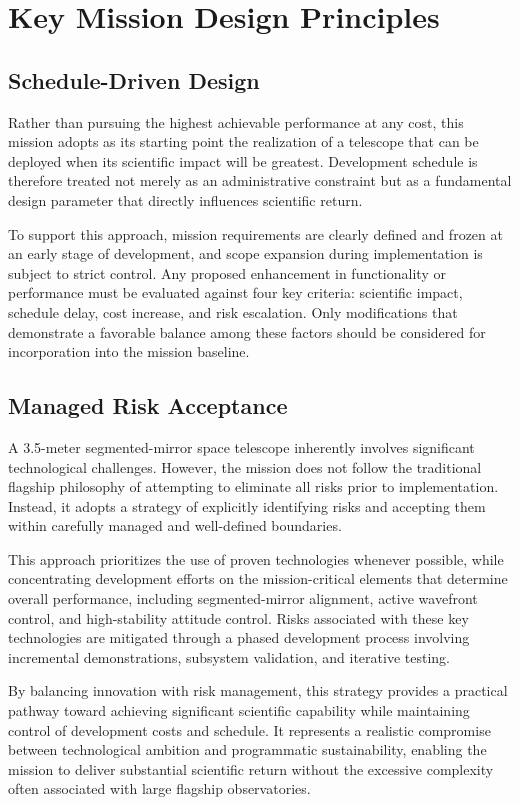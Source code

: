 \section{Key Mission Design Principles}

\subsection{Schedule-Driven Design}

Rather than pursuing the highest achievable performance at any cost, this mission adopts as its starting point the realization of a telescope that can be deployed when its scientific impact will be greatest. Development schedule is therefore treated not merely as an administrative constraint but as a fundamental design parameter that directly influences scientific return.

To support this approach, mission requirements are clearly defined and frozen at an early stage of development, and scope expansion during implementation is subject to strict control. Any proposed enhancement in functionality or performance must be evaluated against four key criteria: scientific impact, schedule delay, cost increase, and risk escalation. Only modifications that demonstrate a favorable balance among these factors should be considered for incorporation into the mission baseline.

\subsection{Managed Risk Acceptance}

A 3.5-meter segmented-mirror space telescope inherently involves significant technological challenges. However, the mission does not follow the traditional flagship philosophy of attempting to eliminate all risks prior to implementation. Instead, it adopts a strategy of explicitly identifying risks and accepting them within carefully managed and well-defined boundaries.

This approach prioritizes the use of proven technologies whenever possible, while concentrating development efforts on the mission-critical elements that determine overall performance, including segmented-mirror alignment, active wavefront control, and high-stability attitude control. Risks associated with these key technologies are mitigated through a phased development process involving incremental demonstrations, subsystem validation, and iterative testing.

By balancing innovation with risk management, this strategy provides a practical pathway toward achieving significant scientific capability while maintaining control of development costs and schedule. It represents a realistic compromise between technological ambition and programmatic sustainability, enabling the mission to deliver substantial scientific return without the excessive complexity often associated with large flagship observatories.


